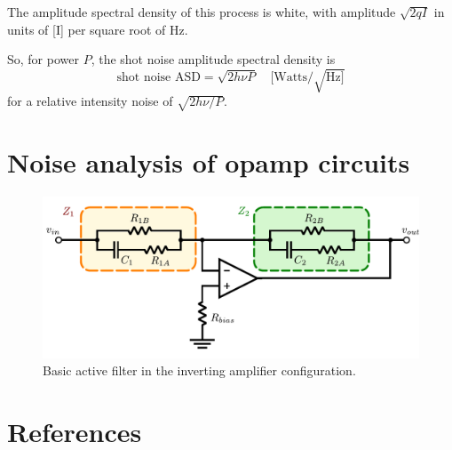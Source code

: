 The amplitude spectral density of this process is white, with
amplitude $\sqrt{2qI}$ in units of [I] per square root of Hz.

So, for power $P$, the shot noise amplitude spectral density is 
\begin{equation}
\text{shot noise ASD} = \sqrt{2 h\nu P}\quad [\text{Watts}/\sqrt{\text{Hz}]}
\label{eq:shotnoise-asd}
\end{equation}
for a relative intensity noise of $\sqrt{2 h\nu/P}$.

\section{Noise analysis of opamp circuits}

\begin{figure}
\includegraphics[width=\columnwidth]{notes/figures/inverting-amp.pdf}
\caption{\label{fig:inverting-amp}Basic active filter in the inverting amplifier configuration.} 
\end{figure}

\section{References}
\cite{Quetschke2007Complex}
